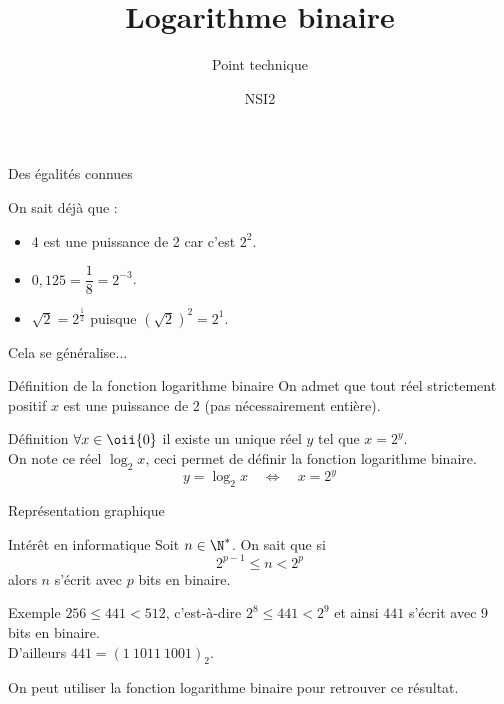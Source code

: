 \documentclass[10pt]{beamer}
\title{Logarithme binaire}
\subtitle{Point technique}
\author{NSI2}
\begin{document}
    
    \maketitle
\begin{frame}{Des égalités connues}

On sait déjà que  :\pause
\begin{itemize}
\item 4 est une puissance de 2 car c'est $2^2$.\pause
\item $0,125=\dfrac{1}{8}=2^{-3}$.\pause
\item $\sqrt{2}=2^{\frac{1}{2}}$ puisque $\left(\sqrt{2}\right)^2=2^1$.\pause
\end{itemize}

Cela se généralise...
\end{frame}
\begin{frame}{Définition de la fonction logarithme binaire}
On admet que tout réel strictement positif $x$ est une puissance de 2 (pas nécessairement entière).\\\pause
\begin{block}{Définition}
$\forall x\in\oii{0}$ il existe un unique réel $y$ tel que $x=2^y$.\\\pause
On note ce réel $\log_2x$, ceci permet de définir la \alert{fonction logarithme binaire}.\pause
$$ y = \log_2x\quad\Longleftrightarrow\quad x = 2^y$$
\end{block}
\end{frame}
\begin{frame}{Représentation graphique}
\begin{center}
\end{center}
\end{frame}
\begin{frame}{Intérêt en informatique}
Soit $n\in\N^*$. On sait que si $$2^{p-1}\leq n< 2^p$$ alors $n$ s'écrit avec $p$ bits en binaire.\pause
\begin{exampleblock}{Exemple}
$256\leq 441<512$, c'est-à-dire $2^8\leq 441< 2^9$ et ainsi $441$ s'écrit avec 9 bits en binaire.\\
D'ailleurs $441=(1\ 1011\ 1001)_2$.
\end{exampleblock}\pause
On peut utiliser la fonction logarithme binaire pour retrouver ce résultat.
\end{frame}
\end{document}
